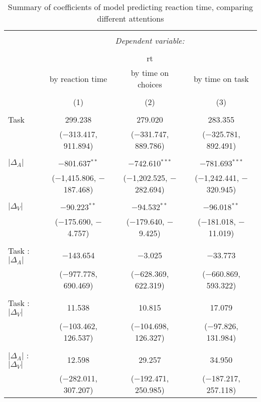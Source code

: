
\begin{table}[h] \centering 
  \caption{Summary of coefficients of model predicting reaction time, comparing different attentions} 
  \label{table:choiceModelAttention} 
\begin{tabular}{@{\extracolsep{5pt}}lccc} 
\\[-1.8ex]\hline 
\hline \\[-1.8ex] 
 & \multicolumn{3}{c}{\textit{Dependent variable:}} \\ 
\cline{2-4} 
\\[-1.8ex] & \multicolumn{3}{c}{rt} \\ 
 & by reaction time & by time on choices & by time on task \\ 
\\[-1.8ex] & (1) & (2) & (3)\\ 
\hline \\[-1.8ex] 
 Task & 299.238 & 279.020 & 283.355 \\ 
  & ($-$313.417, 911.894) & ($-$331.747, 889.786) & ($-$325.781, 892.491) \\ 
  & & & \\ 
 $\vert\Delta_A\vert$ & $-$801.637$^{**}$ & $-$742.610$^{***}$ & $-$781.693$^{***}$ \\ 
  & ($-$1,415.806, $-$187.468) & ($-$1,202.525, $-$282.694) & ($-$1,242.441, $-$320.945) \\ 
  & & & \\ 
 $\vert\Delta_V\vert$ & $-$90.223$^{**}$ & $-$94.532$^{**}$ & $-$96.018$^{**}$ \\ 
  & ($-$175.690, $-$4.757) & ($-$179.640, $-$9.425) & ($-$181.018, $-$11.019) \\ 
  & & & \\ 
 Task : $\vert\Delta_A\vert$ & $-$143.654 & $-$3.025 & $-$33.773 \\ 
  & ($-$977.778, 690.469) & ($-$628.369, 622.319) & ($-$660.869, 593.322) \\ 
  & & & \\ 
 Task : $\vert\Delta_V\vert$ & 11.538 & 10.815 & 17.079 \\ 
  & ($-$103.462, 126.537) & ($-$104.698, 126.327) & ($-$97.826, 131.984) \\ 
  & & & \\ 
 $\vert\Delta_A\vert$ : $\vert\Delta_V\vert$ & 12.598 & 29.257 & 34.950 \\ 
  & ($-$282.011, 307.207) & ($-$192.471, 250.985) & ($-$187.217, 257.118) \\ 

\end{tabular}
\end{table}
